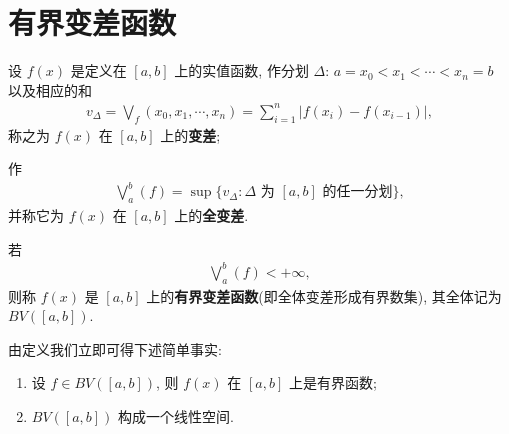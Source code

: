 \documentclass[../../main.tex]{subfiles}%
\begin{document}
\section{有界变差函数}

\begin{definition}[有界变差函数]
设 $f(x)$ 是定义在 $[a,b]$ 上的实值函数, 作分划 $\Delta$: $a=x_0<x_1<\cdots<x_n=b$ 以及相应的和
\begin{align*}
v_{\Delta}=\bigvee_f{\left( x_0,x_1,\cdots ,x_n \right)}=\sum_{i=1}^n{|f(x_i)}-f(x_{i-1})|,
\end{align*}
称之为 $f(x)$ 在 $[a,b]$ 上的\textbf{变差}; 

作
\begin{align*}
\bigvee_a^b(f) = \sup\{v_\Delta: \Delta \text{ 为 } [a,b] \text{ 的任一分划}\},
\end{align*}
并称它为 $f(x)$ 在 $[a,b]$ 上的\textbf{全变差}.

若
\begin{align*}
\bigvee_a^b(f) < +\infty,
\end{align*}
则称 $f(x)$ 是 $[a,b]$ 上的\textbf{有界变差函数}(即全体变差形成有界数集), 其全体记为 $BV([a,b])$.
\end{definition}
\begin{remark}
由定义我们立即可得下述简单事实:
\begin{enumerate}[(1)]
\item 设 $f\in BV([a,b])$, 则 $f(x)$ 在 $[a,b]$ 上是有界函数;
\item $BV([a,b])$ 构成一个线性空间.
\end{enumerate}
\end{remark}
\end{document}
